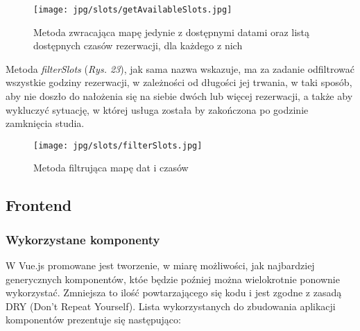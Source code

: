 \documentclass[11pt,a4paper]{article}
\begin{document}
\begin{figure}[H]
    \centering
    \texttt{[image: jpg/slots/getAvailableSlots.jpg]}
    \caption{Metoda zwracająca mapę jedynie z dostępnymi datami oraz listą dostępnych czasów rezerwacji, dla każdego z nich}
\end{figure}

\noindent
Metoda \textsl{filterSlots} (\textsl{Rys. 23}), jak sama nazwa wskazuje, ma za zadanie odfiltrować wszystkie godziny rezerwacji, w zależności od długości jej trwania, w taki sposób, aby nie doszło do nałożenia się na siebie dwóch lub więcej rezerwacji, a także aby wykluczyć sytuację, w której usługa została by zakończona po godzinie zamknięcia studia.

\begin{figure}[H]
    \centering
    \texttt{[image: jpg/slots/filterSlots.jpg]}
    \caption{Metoda filtrująca mapę dat i czasów}
\end{figure}

\subsection{Frontend}

\subsubsection{Wykorzystane komponenty}
W Vue.js promowane jest tworzenie, w miarę możliwości, jak najbardziej generycznych komponentów, któe będzie poźniej można wielokrotnie ponownie wykorzystać. Zmniejsza to ilość powtarzającego się kodu i jest zgodne z zasadą DRY (Don't Repeat Yourself). Lista wykorzystanych do zbudowania aplikacji komponentów prezentuje się następująco:
\end{document}
